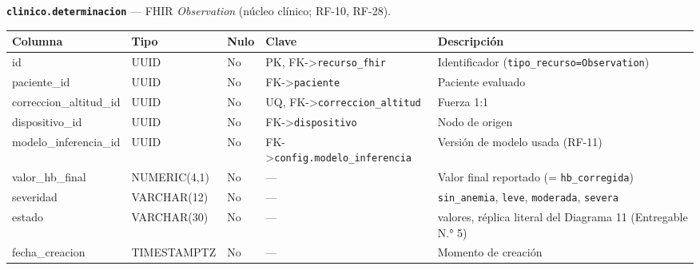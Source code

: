 \documentclass[11pt,a4paper]{article}
\begin{document}
\textbf{\texttt{clinico.determinacion}} --- FHIR \emph{Observation} (núcleo clínico; RF-10, RF-28).

{\small
\begin{longtable}[]{@{}
  >{\raggedright\arraybackslash}p{}
  >{\raggedright\arraybackslash}p{}
  >{\raggedright\arraybackslash}p{}
  >{\raggedright\arraybackslash}p{}
  >{\raggedright\arraybackslash}p{}@{}}
\toprule\noalign{}
\begin{minipage}[b]{\linewidth}\raggedright
Columna
\end{minipage} & \begin{minipage}[b]{\linewidth}\raggedright
Tipo
\end{minipage} & \begin{minipage}[b]{\linewidth}\raggedright
Nulo
\end{minipage} & \begin{minipage}[b]{\linewidth}\raggedright
Clave
\end{minipage} & \begin{minipage}[b]{\linewidth}\raggedright
Descripción
\end{minipage} \\
\midrule\noalign{}
\endhead
\bottomrule\noalign{}
\endlastfoot
id & UUID & No & PK, FK-\textgreater{}\texttt{recurso\_fhir} & Identificador (\texttt{tipo\_recurso=\textquotesingle{}Observation\textquotesingle{}}) \\
paciente\_id & UUID & No & FK-\textgreater{}\texttt{paciente} & Paciente evaluado \\
correccion\_altitud\_id & UUID & No & UQ, FK-\textgreater{}\texttt{correccion\_altitud} & Fuerza 1:1 \\
dispositivo\_id & UUID & No & FK-\textgreater{}\texttt{dispositivo} & Nodo de origen \\
modelo\_inferencia\_id & UUID & No & FK-\textgreater{}\texttt{config.modelo\_inferencia} & Versión de modelo usada (RF-11) \\
valor\_hb\_final & NUMERIC(4,1) & No & --- & Valor final reportado (= \texttt{hb\_corregida}) \\
severidad & VARCHAR(12) & No & --- & \texttt{sin\_anemia}, \texttt{leve}, \texttt{moderada}, \texttt{severa} \\
estado & VARCHAR(30) & No & --- & 9 valores, réplica literal del Diagrama 11 (Entregable N.° 5) \\
fecha\_creacion & TIMESTAMPTZ & No & --- & Momento de creación \\
\end{longtable}
}
\end{document}
